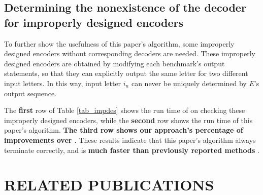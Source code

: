 \documentclass[journal]{IEEEtran}
\begin{document}
%



\subsection{Determining the nonexistence of the decoder for improperly designed encoders}\label{subsec_improp}
To further show the usefulness of this paper's algorithm,
some improperly designed encoders without corresponding decoders are needed.
These improperly designed encoders are obtained by modifying each benchmark's output statements,
so that they can explicitly output the same letter for two different input letters.
In this way,
input letter $i_n$ can never be uniquely determined by $E$'s output sequence.

The \textbf{first} row of Table \ref{tab_impdes} shows the run time of \cite{ShengYuShen:fmcad10} on checking these improperly designed encoders,
while the \textbf{second} row shows the run time of this paper's algorithm.
\textbf{The third row shows our approach's percentage of improvements over \cite{ShengYuShen:fmcad10}}.
These results indicate that this paper's algorithm always terminate correctly,
and is \textbf{much faster than previously reported methods} \cite{ShengYuShen:fmcad10}.


\section{RELATED PUBLICATIONS}\label{sec_relwork}
%
%
\end{document}
